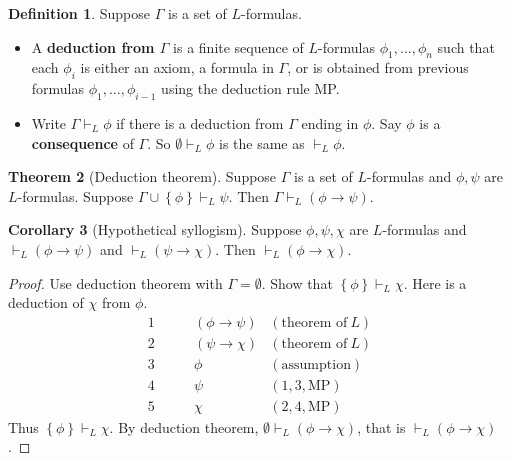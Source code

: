 \documentclass{article}
\newcommand{\rb}[1]{\left( #1 \right)}
\newcommand{\cb}[1]{\left\{ #1 \right\}}
\newcommand{\impb}[2]{\rb{#1 \rightarrow #2}}
\theoremstyle{definition}\newtheorem{definition}{Definition}[subsection]
\theoremstyle{definition}\newtheorem{remark1}[definition]{Remark}
\theoremstyle{definition}\newtheorem{example1}[definition]{Example}
\theoremstyle{definition}\newtheorem*{remark2}{Remark}
\theoremstyle{definition}\newtheorem*{example2}{Example}
\theoremstyle{definition}\newtheorem*{note}{Note}
\theoremstyle{definition}\newtheorem*{notation}{Notation}
\newtheorem{theorem}[definition]{Theorem}
\newtheorem{corollary}[definition]{Corollary}
\begin{document}
\pagebreak


\begin{definition}
Suppose $ \Gamma $ is a set of $ L $-formulas.
\begin{itemize}
\item A \textbf{deduction from $ \Gamma $} is a finite sequence of $ L $-formulas $ \phi_1, \dots, \phi_n $ such that each $ \phi_i $ is either an axiom, a formula in $ \Gamma $, or is obtained from previous formulas $ \phi_1, \dots, \phi_{i - 1} $ using the deduction rule MP.
\item Write $ \Gamma \vdash_L \phi $ if there is a deduction from $ \Gamma $ ending in $ \phi $. Say $ \phi $ is a \textbf{consequence} of $ \Gamma $. So $ \emptyset \vdash_L \phi $ is the same as $ \vdash_L \phi $.
\end{itemize}
\end{definition}

\begin{theorem}[Deduction theorem]
\label{thm:1.2.5}
Suppose $ \Gamma $ is a set of $ L $-formulas and $ \phi, \psi $ are $ L $-formulas. Suppose $ \Gamma \cup \cb{\phi} \vdash_L \psi $. Then $ \Gamma \vdash_L \impb{\phi}{\psi} $.
\end{theorem}

\begin{corollary}[Hypothetical syllogism]
Suppose $ \phi, \psi, \chi $ are $ L $-formulas and $ \vdash_L \impb{\phi}{\psi} $ and $ \vdash_L \impb{\psi}{\chi} $. Then $ \vdash_L \impb{\phi}{\chi} $.
\end{corollary}

\begin{proof}
Use deduction theorem with $ \Gamma = \emptyset $. Show that $ \cb{\phi} \vdash_L \chi $. Here is a deduction of $ \chi $ from $ \phi $.
\begin{align*}
1 \qquad & \impb{\phi}{\psi} & \rb{\text{theorem of} \ L} \\
2 \qquad & \impb{\psi}{\chi} & \rb{\text{theorem of} \ L} \\
3 \qquad & \phi & \rb{\text{assumption}} \\
4 \qquad & \psi & \rb{1, 3, \text{MP}} \\
5 \qquad & \chi & \rb{2, 4, \text{MP}}
\end{align*}
Thus $ \cb{\phi} \vdash_L \chi $. By deduction theorem, $ \emptyset \vdash_L \impb{\phi}{\chi} $, that is $ \vdash_L \impb{\phi}{\chi} $.
\end{proof}
\end{document}

